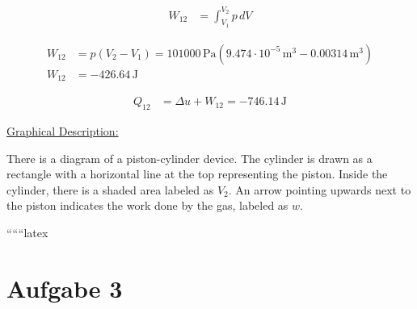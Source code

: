 \begin{align*}
    W_{12} &= \int_{V_1}^{V_2} p \, dV
\end{align*}

\begin{align*}
    W_{12} &= p (V_2 - V_1) = 101000 \, \text{Pa} \left(9.474 \cdot 10^{-5} \, \text{m}^3 - 0.00314 \, \text{m}^3 \right) \\
    W_{12} &= -426.64 \, \text{J}
\end{align*}

\begin{align*}
    Q_{12} &= \Delta u + W_{12} = -746.14 \, \text{J}
\end{align*}

\underline{Graphical Description:}

There is a diagram of a piston-cylinder device. The cylinder is drawn as a rectangle with a horizontal line at the top representing the piston. Inside the cylinder, there is a shaded area labeled as $V_2$. An arrow pointing upwards next to the piston indicates the work done by the gas, labeled as $w$.

``````latex


\section*{Aufgabe 3}